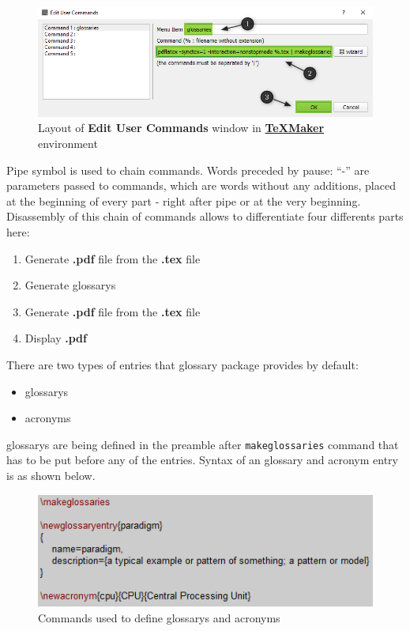 \begin{figure}[H]
\centering
\includegraphics[scale=0.6]{content/LaTeX/figures/custom_command_marked.png}
\caption{Layout of \textbf{Edit User Commands} window in \textbf{\href{https://www.xm1math.net/texmaker/}{TeXMaker}} environment}
\end{figure}

Pipe symbol is used to chain commands. Words preceded by pause: ``-'' are \glspl{parameter} passed to commands, which are words without any additions, placed at the beginning of every part - right after pipe or at the very beginning. Disassembly of this chain of commands allows to differentiate four differents parts here:
\begin{enumerate}
\item Generate \textbf{.pdf} file from the \textbf{.tex} file
\item Generate \glspl{glossary}
\item Generate \textbf{.pdf} file from the \textbf{.tex} file
\item Display \textbf{.pdf}
\end{enumerate}

There are two types of entries that \gls{glossary} package provides by default:
\begin{itemize}
\item \glspl{glossary}
\item acronyms
\end{itemize}

\Glspl{glossary} are being defined in the preamble after \texttt{\bs makeglossaries} command that has to be put before any of the entries. Syntax of an \gls{glossary} and acronym entry is as shown below.

\begin{figure}[H]
\centering
\includegraphics[scale=1.0]{content/LaTeX/figures/glossary_definition.png}
\caption{Commands used to define \glspl{glossary} and acronyms}
\label{fig:glossary_definition}
\end{figure}

